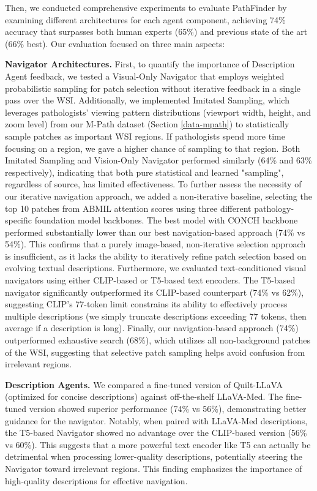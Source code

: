 Then, we conducted comprehensive experiments to evaluate PathFinder by examining different architectures for each agent component, achieving 74\% accuracy that surpasses both human experts (65\%) and previous state of the art (66\% best). Our evaluation focused on three main aspects:

\noindent
\textbf{Navigator Architectures.} First, to quantify the importance of Description Agent feedback, we tested a Visual-Only Navigator that employs weighted probabilistic sampling for patch selection without iterative feedback in a single pass over the WSI. Additionally, we implemented Imitated Sampling, which leverages pathologists' viewing pattern distributions (viewport width, height, and zoom level) from our M-Path dataset (Section \ref{data-mpath}) to statistically sample patches as important WSI regions. If pathologists spend more time focusing on a region, we gave a higher chance of sampling to that region.  Both Imitated Sampling and Vision-Only Navigator performed similarly (64\% and 63\% respectively), indicating that both pure statistical and learned "sampling", regardless of source, has limited effectiveness. 
To further assess the necessity of our iterative navigation approach, we added a non-iterative baseline, selecting the top 10 patches from ABMIL attention scores using three different pathology-specific foundation model backbones. The best model with CONCH\cite{conch} backbone performed substantially lower than our best navigation-based approach (74\% vs 54\%). This confirms that a purely image-based, non-iterative selection approach is insufficient, as it lacks the ability to iteratively refine patch selection based on evolving textual descriptions. 
Furthermore, we evaluated text-conditioned visual navigators using either CLIP-based or T5-based text encoders. The T5-based navigator significantly outperformed its CLIP-based counterpart (74\% vs 62\%), suggesting CLIP's 77-token limit constrains its ability to effectively process multiple descriptions (we simply truncate descriptions exceeding 77 tokens, then average if a description is long). Finally, our navigation-based approach (74\%) outperformed exhaustive search (68\%), which utilizes all non-background patches of the WSI, suggesting that selective patch sampling helps avoid confusion from irrelevant regions.




\noindent
\textbf{Description Agents.} We compared a fine-tuned version of Quilt-LLaVA (optimized for concise descriptions) against off-the-shelf LLaVA-Med. The fine-tuned version showed superior performance (74\% vs 56\%), demonstrating better guidance for the navigator. Notably, when paired with LLaVA-Med descriptions, the T5-based Navigator showed no advantage over the CLIP-based version (56\% vs 60\%). This suggests that a more powerful text encoder like T5 can actually be detrimental when processing lower-quality descriptions, potentially steering the Navigator toward irrelevant regions. This finding emphasizes the importance of high-quality descriptions for effective navigation.

